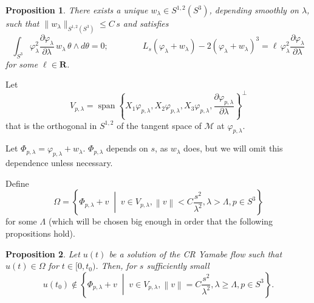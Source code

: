 \documentclass[a4paper,12pt]{amsart}
\newtheorem{proposizione}{Proposition}[section]
\renewcommand{\phi}{\varphi}
\newcommand{\de}{\partial}
\newcommand{\R}{\mathbf{R}}
\newcommand{\ci}[1]{\mathscr{#1}}%
\newcommand{\rosso}[1]{{\color{red}#1}}
\newcommand{\verde}[1]{{\color{green}#1}}
\newcommand{\N}[1]{\left\lVert#1\right\rVert}
\begin{document}
\begin{proposizione} 
There exists a unique $w_\lambda \in S^{1,2}(S^3)$, depending 
smoothly on $\lambda$, such that $\|w_\lambda\|_{S^{1,2}(S^3)} \leq C \, s$ and satisfies 
\begin{equation*}
\int_{S^3} \phi_{\lambda}^2 \frac{\de\phi_{\lambda}}{\de\lambda} \, w_\lambda  \, 
   \theta\wedge d\theta = 0; \qquad \qquad  L_s (\phi_{\lambda} + w_\lambda)  - 2 
   (\phi_{\lambda} + w_\lambda)^3 
   = \ell \, \phi_\lambda^2 \frac{\de\phi_{\lambda}}{\de\lambda} 
\end{equation*}
for some $\ell \in \R$.
\end{proposizione}

Let
$$V_{p,\lambda}=\operatorname{span}\left\{X_1\phi_{p,\lambda}, X_2\phi_{p,\lambda},X_3\phi_{p,\lambda},\frac{\de\phi_{p,\lambda}}{\de\lambda}\right\}^{\perp}$$
that is the orthogonal in $S^{1,2}$ of the tangent space of $\ci{M}$ at $\phi_{p,\lambda}$.

Let $\Phi_{p,\lambda}=\phi_{p,\lambda} + w_\lambda$. $\Phi_{p,\lambda}$ depends on $s$, as $w_\lambda$ does, but we will omit this dependence unless necessary.

Define
$$\Omega=\left\{\Phi_{p,\lambda}+v\;\middle|\; v\in V_{p,\lambda}, \N{v}<C\frac{s^2}{\lambda^2}, \lambda>\Lambda,p\in S^3
\right\}$$
for some $\Lambda$ (which will be chosen big enough in order that the following propositions hold).

\begin{proposizione}\label{PropositionLateralBoundary}
 Let $u(t)$ be a solution of the CR Yamabe flow such that $u(t)\in\Omega$ for $t\in[0,t_0)$. Then, for $s$ sufficiently small
 $$u(t_0)\not\in\left\{\Phi_{p,\lambda}+v\;\middle|\; v\in V_{p,\lambda}, \N{v}=C\frac{s^2}{\lambda^2}, \lambda\ge\Lambda,p\in S^3 \right\}.$$
\end{proposizione}
\end{document}
